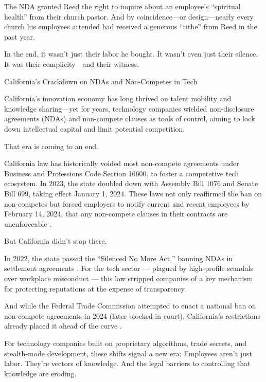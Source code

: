 The NDA granted Reed the right to inquire about an employee’s “spiritual health” from their church pastor. And by coincidence—or design—nearly every church his employees attended had received a generous “tithe” from Reed in the past year.

In the end, it wasn’t just their labor he bought.  
It wasn’t even just their silence.  
It was their complicity—and their witness.

\medskip

\begin{HistoricalSidebar}{California’s Crackdown on NDAs and Non-Competes in Tech}

California’s innovation economy has long thrived on talent mobility and knowledge sharing—yet for years, technology companies wielded non-disclosure agreements (NDAs) and non-compete clauses as tools of control, aiming to lock down intellectual capital and limit potential competition.

\medskip

That era is coming to an end.

\medskip

California law has historically voided most non-compete agreements under Business and Professions Code Section 16600, to foster a competetive tech ecosystem. In 2023, the state doubled down with Assembly Bill 1076 and Senate Bill 699, taking effect January 1, 2024. These laws not only reaffirmed the ban on non-competes but forced employers to notify current and recent employees by February 14, 2024, that any non-compete clauses in their contracts are unenforceable \cite{turn0search3}.

\medskip

But California didn’t stop there.

\medskip

In 2022, the state passed the “Silenced No More Act,” banning NDAs in settlement agreements \cite{turn0search14}. For the tech sector --- plagued by high-profile scandals over workplace misconduct --- this law stripped companies of a key mechanism for protecting reputations at the expense of transparency.

\medskip

And while the Federal Trade Commission attempted to enact a national ban on non-compete agreements in 2024 (later blocked in court), California’s restrictions already placed it ahead of the curve \cite{turn0news21}.

\medskip

For technology companies built on proprietary algorithms, trade secrets, and stealth-mode development, these shifts signal a new era:  
Employees aren’t just labor. They’re vectors of knowledge. And the legal barriers to controlling that knowledge are eroding.


\end{HistoricalSidebar}
